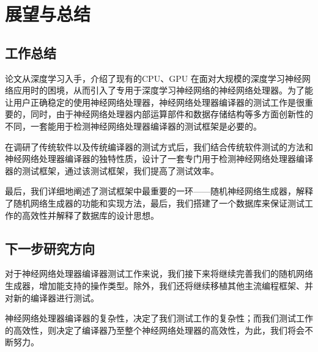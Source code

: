 ﻿\chapter{展望与总结}
\section{工作总结}
论文从深度学习入手，介绍了现有的CPU、GPU 在面对大规模的深度学习神经网络应用时的困境，从而引入了专用于深度学习神经网络的神经网络处理器。为了能让用户正确稳定的使用神经网络处理器，神经网络处理器编译器的测试工作是很重要的，同时，由于神经网络处理器内部运算部件和数据存储结构等多方面创新性的不同，一套能用于检测神经网络处理器编译器的测试框架是必要的。

在调研了传统软件以及传统编译器的测试方式后，我们结合传统软件测试的方法和神经网络处理器编译器的独特性质，设计了一套专门用于检测神经网络处理器编译器的测试框架，通过该测试框架，我们提高了测试效率。

最后，我们详细地阐述了测试框架中最重要的一环——随机神经网络生成器，解释了随机网络生成器的功能和实现方法，最后，我们搭建了一个数据库来保证测试工作的高效性并解释了数据库的设计思想。

\section{下一步研究方向}
对于神经网络处理器编译器测试工作来说，我们接下来将继续完善我们的随机网络生成器，增加能支持的操作类型。除外，我们还将继续移植其他主流编程框架、并对新的编译器进行测试。

神经网络处理器编译器的复杂性，决定了我们测试工作的复杂性；而我们测试工作的高效性，则决定了编译器乃至整个神经网络处理器的高效性，为此，我们将会不断努力。
